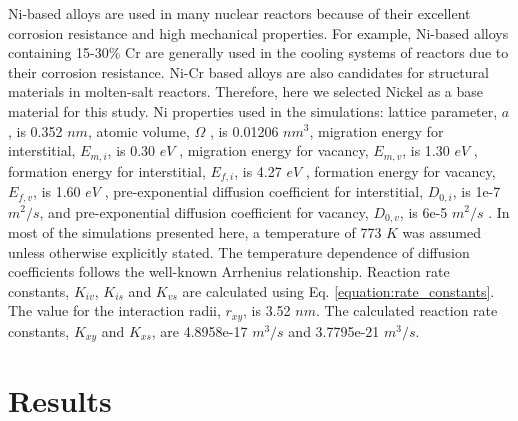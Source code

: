 \documentclass[utf8]{frontiersSCNS} %
\begin{document}
    Ni-based alloys are used in many nuclear reactors because of their excellent corrosion resistance and high mechanical properties. For example, Ni-based alloys containing 15-30\% Cr are generally used in the cooling systems of reactors due to their corrosion resistance. Ni-Cr based alloys are also candidates for structural materials in molten-salt reactors. Therefore, here we selected Nickel as a base material for this study. Ni properties used in the simulations: lattice parameter, $a$, is 0.352 $nm$, atomic volume, $\Omega$ , is 0.01206 $nm^3$, migration energy for interstitial, $E_{m,i}$, is 0.30 $eV$ , migration energy for vacancy, $E_{m,v}$, is 1.30 $eV$ , formation energy for interstitial, $E_{f,i}$, is 4.27 $eV$ , formation energy for vacancy, $E_{f,v}$, is 1.60 $eV$ , pre-exponential diffusion coefficient for interstitial, $D_{0,i}$, is 1e-7 $m^2/s$, and pre-exponential diffusion coefficient for vacancy, $D_{0,v}$, is 6e-5 $m^2/s$ \citep{walgraef1996,zhao2016}. In most of the simulations presented here, a temperature of 773 $K$ was assumed unless otherwise explicitly stated. The temperature dependence of diffusion coefficients follows the well-known Arrhenius relationship. Reaction rate constants, $K_{iv}$, $K_{is}$ and $K_{vs}$ are calculated using Eq. \ref{equation:rate_constants}. The value for the interaction radii, $r_{xy}$, is 3.52 $nm$. The calculated reaction rate constants, $K_{xy}$ and $K_{xs}$, are 4.8958e-17 $m^3/s$ and 3.7795e-21 $m^3/s$.
    

\section{Results}
   
\end{document}
